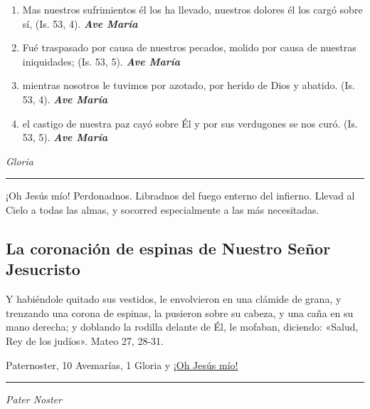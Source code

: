 \documentclass[a4paper,11pt, oneside]{report}
\begin{document}
{{\begin{enumerate}
        \item Mas nuestros sufrimientos él los ha llevado, nuestros dolores él los cargó sobre sí, (Is. 53, 4). \textbf{\textit{Ave María}}

        \item Fué traspasado por causa de nuestros pecados, molido por causa de nuestras iniquidades; (Is. 53, 5). \textbf{\textit{Ave María}}

        \item mientras nosotros le tuvimos por azotado, por herido de Dios y abatido. (Is. 53, 4). \textbf{\textit{Ave María}}

        \item el castigo de nuestra paz cayó sobre Él y por sus verdugones se nos curó. (Is. 53, 5). \textbf{\textit{Ave María}}

      \end{enumerate}

      \indent\textit{Gloria} \par

      \begin{center}\rule{1\linewidth}{\linethickness}\end{center}
    
      \medskip
      \hypertarget{finalFlagelacion}{¡Oh Jesús mío! Perdonadnos. Libradnos del fuego enterno del infierno. Llevad al Cielo a todas las almas, y socorred especialmente a las más 
      necesitadas.}
    }

  
  \subsection*{La coronación de espinas de Nuestro Señor Jesucristo}
    {
      Y habiéndole quitado sus vestidos, le envolvieron en una clámide de grana, y trenzando una corona de espinas, la pusieron sobre su cabeza, y una
      caña en su mano derecha; y doblando la rodilla delante de Él, le mofaban, diciendo: «Salud, Rey de los judíos». Mateo 27, 28-31.
      
       Paternoster, 10 Avemarías, 1 Gloria y \hyperlink{finalCoronacion}{¡Oh Jesús mío!}

      \medskip

      \begin{center}\rule{1\linewidth}{\linethickness}\end{center}

      \medskip
      \textit{Pater Noster}

}}
\end{document}
